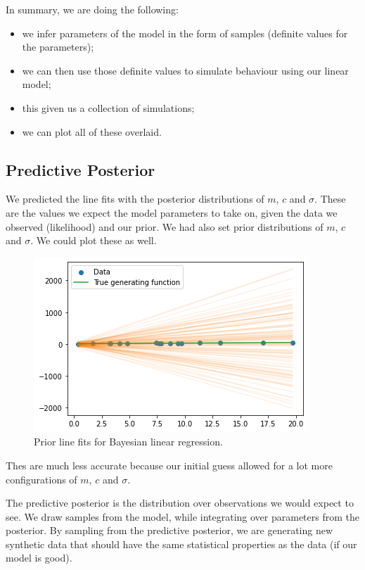 \documentclass[a4paper, openany]{memoir}
\begin{document}
In summary, we are doing the following:
\begin{itemize}
    \item we infer parameters of the model in the form of samples (definite values for the parameters);
    \item we can then use those definite values to simulate behaviour using our linear model;
    \item this given us a collection of simulations;
    \item we can plot all of these overlaid.
\end{itemize}

\subsection{Predictive Posterior}
We predicted the line fits with the posterior distributions of $m$, $c$ and $\sigma$. These are the values we expect the model parameters to take on, given the data we observed (likelihood) and our prior. We had also set prior distributions of $m$, $c$ and $\sigma$. We could plot these as well.
\begin{figure}[H]
    \centering
    \includegraphics[scale=0.6]{src/5.36 linefit bayesian prior.png}
    \caption{Prior line fits for Bayesian linear regression.}
\end{figure}
\noindent Thes are much less accurate because our initial guess allowed for a lot more configurations of $m$, $c$ and $\sigma$.

The predictive posterior is the distribution over observations we would expect to see. We draw samples from the model, while integrating over parameters from the posterior. By sampling from the predictive posterior, we are generating new synthetic data that should have the same statistical properties as the data (if our model is good).
\end{document}
